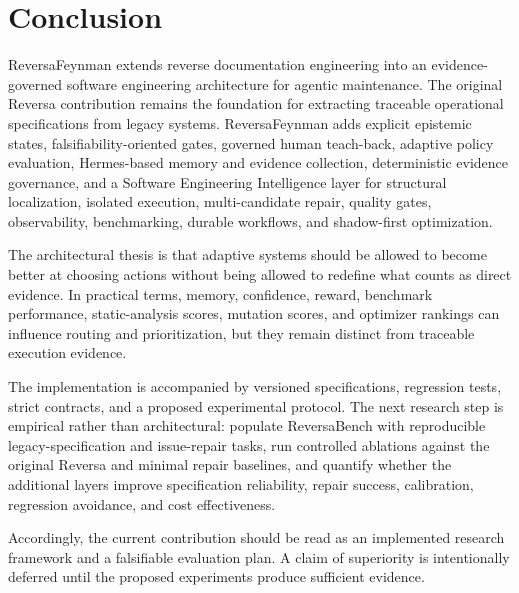 \section{Conclusion}

ReversaFeynman extends reverse documentation engineering into an evidence-governed software engineering architecture for agentic maintenance. The original Reversa contribution remains the foundation for extracting traceable operational specifications from legacy systems. ReversaFeynman adds explicit epistemic states, falsifiability-oriented gates, governed human teach-back, adaptive policy evaluation, Hermes-based memory and evidence collection, deterministic evidence governance, and a Software Engineering Intelligence layer for structural localization, isolated execution, multi-candidate repair, quality gates, observability, benchmarking, durable workflows, and shadow-first optimization.

The architectural thesis is that adaptive systems should be allowed to become better at choosing actions without being allowed to redefine what counts as direct evidence. In practical terms, memory, confidence, reward, benchmark performance, static-analysis scores, mutation scores, and optimizer rankings can influence routing and prioritization, but they remain distinct from traceable execution evidence.

The implementation is accompanied by versioned specifications, regression tests, strict contracts, and a proposed experimental protocol. The next research step is empirical rather than architectural: populate ReversaBench with reproducible legacy-specification and issue-repair tasks, run controlled ablations against the original Reversa and minimal repair baselines, and quantify whether the additional layers improve specification reliability, repair success, calibration, regression avoidance, and cost effectiveness.

Accordingly, the current contribution should be read as an implemented research framework and a falsifiable evaluation plan. A claim of superiority is intentionally deferred until the proposed experiments produce sufficient evidence.